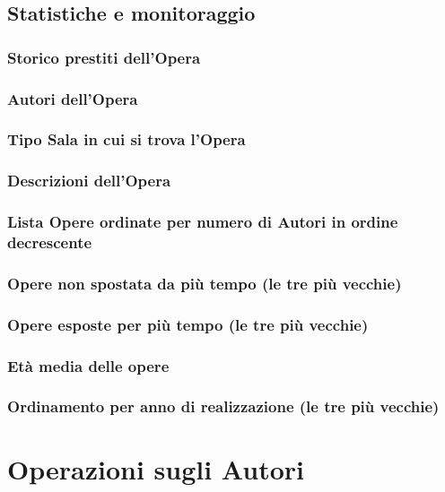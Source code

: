 \documentclass[a4paper,11pt]{article}
\begin{document}
\subsection{Statistiche e monitoraggio}

\subsubsection{Storico prestiti dell’Opera}
\subsubsection{Autori dell’Opera}
\subsubsection{Tipo Sala in cui si trova l’Opera}
\subsubsection{Descrizioni dell’Opera}
\subsubsection{Lista Opere ordinate per numero di Autori in ordine decrescente}
\subsubsection{Opere non spostata da più tempo (le tre più vecchie)}
\subsubsection{Opere esposte per più tempo (le tre più vecchie)}
\subsubsection{Età media delle opere}
\subsubsection{Ordinamento per anno di realizzazione (le tre più vecchie)}

\newpage

\section{Operazioni sugli Autori}

\end{document}
